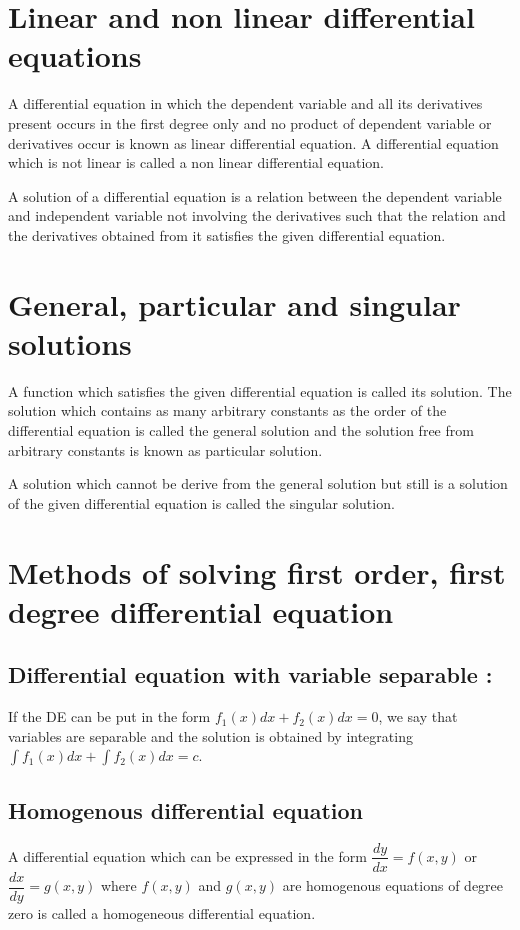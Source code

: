 \section*{Linear and non linear differential equations} 
 \par A differential equation in which the dependent variable and all its derivatives present occurs in the first degree only and no product of dependent variable or derivatives occur is known as linear differential equation. A differential equation which is not linear is called a non linear differential equation.
 \par A solution of a differential equation is a relation between the dependent variable and independent variable not involving the derivatives such that the relation and the derivatives obtained from it satisfies the given differential equation.                                             
 \section*{General, particular  and singular solutions} 
 \par A function which satisfies the given differential equation is called its solution. The solution  which contains as many arbitrary constants as the order of the differential equation is called the general solution and the solution free from arbitrary constants is known as particular solution. 
 \par A solution which cannot be derive from the general solution but still is a solution of the given differential equation is called the singular solution.
 \section*{Methods of solving first order, first degree differential equation} 
 \subsection*{Differential equation with variable separable :}
 \par If the DE can be put in the form  $f_{1}(x)dx + f_{2}(x)dx = 0 $, we say that variables are separable and the solution is obtained by integrating $  \int f_{1}(x)dx + \int f_{2}(x)dx = c$.
  
 \subsection*{Homogenous differential equation} \par A differential equation which can be expressed in the form   $ \dfrac{dy}{dx}=f(x,y)$ or $ \dfrac{dx}{dy}=g(x,y)$ where $f(x,y)$ and $g(x,y)$ are homogenous equations of degree zero is called a homogeneous differential equation.
